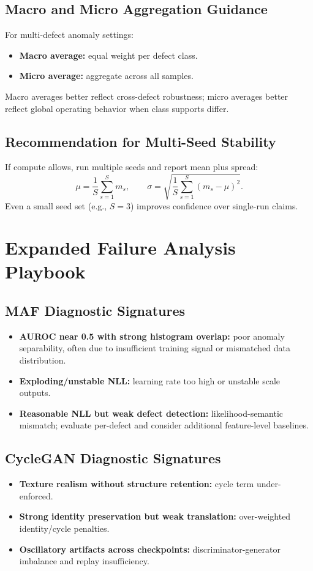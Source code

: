 \documentclass[conference]{IEEEtran}
\begin{document}
\subsection{Macro and Micro Aggregation Guidance}
For multi-defect anomaly settings:
\begin{itemize}
\item \textbf{Macro average:} equal weight per defect class.
\item \textbf{Micro average:} aggregate across all samples.
\end{itemize}
Macro averages better reflect cross-defect robustness; micro averages better reflect global operating behavior when class supports differ.

\subsection{Recommendation for Multi-Seed Stability}
If compute allows, run multiple seeds and report mean plus spread:
\begin{equation}
\mu = \frac{1}{S}\sum_{s=1}^{S} m_s,\qquad
\sigma = \sqrt{\frac{1}{S}\sum_{s=1}^{S}(m_s-\mu)^2}.
\end{equation}
Even a small seed set (e.g., $S=3$) improves confidence over single-run claims.

\section{Expanded Failure Analysis Playbook}
\subsection{MAF Diagnostic Signatures}
\begin{itemize}
\item \textbf{AUROC near 0.5 with strong histogram overlap:} poor anomaly separability, often due to insufficient training signal or mismatched data distribution.
\item \textbf{Exploding/unstable NLL:} learning rate too high or unstable scale outputs.
\item \textbf{Reasonable NLL but weak defect detection:} likelihood-semantic mismatch; evaluate per-defect and consider additional feature-level baselines.
\end{itemize}

\subsection{CycleGAN Diagnostic Signatures}
\begin{itemize}
\item \textbf{Texture realism without structure retention:} cycle term under-enforced.
\item \textbf{Strong identity preservation but weak translation:} over-weighted identity/cycle penalties.
\item \textbf{Oscillatory artifacts across checkpoints:} discriminator-generator imbalance and replay insufficiency.
\end{itemize}
\end{document}
